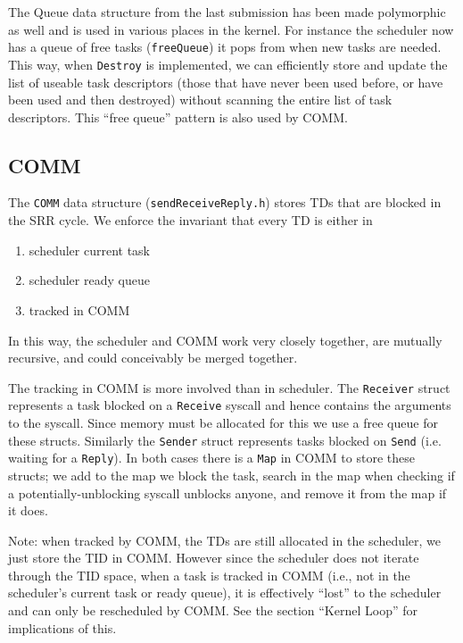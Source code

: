 \documentclass{article}
\begin{document}
The Queue data structure from the last submission has been made polymorphic as well and is used in various places in the kernel. For instance the scheduler now has a queue of free tasks (\texttt{freeQueue}) it pops from when new tasks are needed. This way, when \texttt{Destroy} is implemented, we can efficiently store and update the list of useable task descriptors (those that have never been used before, or have been used and then destroyed) without scanning the entire list of task descriptors. This ``free queue'' pattern is also used by COMM.

\subsection*{COMM}

The \texttt{COMM} data structure (\texttt{sendReceiveReply.h}) stores TDs that are blocked in the SRR cycle. We enforce the invariant that every TD is either in

\begin{enumerate}
    \item scheduler current task
    \item scheduler ready queue
    \item tracked in COMM
\end{enumerate}

In this way, the scheduler and COMM work very closely together, are mutually recursive, and could conceivably be merged together.

The tracking in COMM is more involved than in scheduler. The \texttt{Receiver} struct represents a task blocked on a \texttt{Receive} syscall and hence contains the arguments to the syscall. Since memory must be allocated for this we use a free queue for these structs. Similarly the \texttt{Sender} struct represents tasks blocked on \texttt{Send} (i.e. waiting for a \texttt{Reply}). In both cases there is a \texttt{Map} in COMM to store these structs; we add to the map we block the task, search in the map when checking if a potentially-unblocking syscall unblocks anyone, and remove it from the map if it does.

Note: when tracked by COMM, the TDs are still allocated in the scheduler, we just store the TID in COMM. However since the scheduler does not iterate through the TID space, when a task is tracked in COMM (i.e., not in the scheduler's current task or ready queue), it is effectively ``lost'' to the scheduler and can only be rescheduled by COMM. See the section ``Kernel Loop'' for implications of this.
\end{document}
